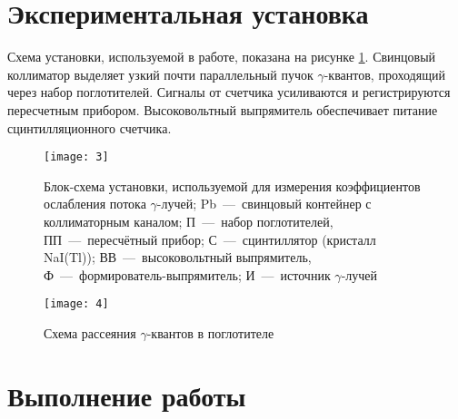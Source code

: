 \documentclass{lab}
\begin{document}
\newpage
	
\section*{Экспериментальная установка}

	Схема установки, используемой в работе, показана на рисунке \ref{scheme1}. Свинцовый 
	коллиматор выделяет узкий почти параллельный пучок $ \gamma $-квантов, проходящий через 
	набор поглотителей. Сигналы от счетчика усиливаются и регистрируются пересчетным 
	прибором. Высоковольтный выпрямитель обеспечивает питание сцинтилляционного счетчика.
	
	\begin{figure} [h!]
		\centering
		\texttt{[image: 3]}
		\caption{Блок-схема установки, используемой для измерения коэффициентов ослабления 
			потока $\gamma$-лучей; Pb~---~свинцовый контейнер с коллиматорным каналом; 
			П~---~набор поглотителей, ПП~---~пересчётный прибор; С~---~сцинтиллятор 
			(кристалл NaI(Tl)); ВВ~---~высоковольтный выпрямитель, 
			Ф~---~формирователь-выпрямитель; И~---~источник $\gamma$-лучей}
		\label{scheme1}
	\end{figure}
	
	\begin{figure} [h!]
		\centering
		\texttt{[image: 4]}
		\caption{Схема рассеяния $\gamma$-квантов в поглотителе}
	\end{figure}

\newpage

\section*{Выполнение работы}
\end{document}
